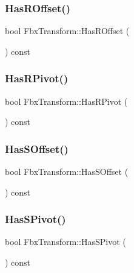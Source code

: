 \subsubsection{\texorpdfstring{Has\+R\+Offset()}{HasROffset()}}
{\footnotesize\ttfamily bool Fbx\+Transform\+::\+Has\+R\+Offset (\begin{DoxyParamCaption}{ }\end{DoxyParamCaption}) const}

\mbox{\label{class_fbx_transform_af7c5853f01369b5505255c8a92aa8ef7}} 
\subsubsection{\texorpdfstring{Has\+R\+Pivot()}{HasRPivot()}}
{\footnotesize\ttfamily bool Fbx\+Transform\+::\+Has\+R\+Pivot (\begin{DoxyParamCaption}{ }\end{DoxyParamCaption}) const}

\mbox{\label{class_fbx_transform_a09e89d031fec95246efe655aee157bac}} 
\subsubsection{\texorpdfstring{Has\+S\+Offset()}{HasSOffset()}}
{\footnotesize\ttfamily bool Fbx\+Transform\+::\+Has\+S\+Offset (\begin{DoxyParamCaption}{ }\end{DoxyParamCaption}) const}

\mbox{\label{class_fbx_transform_a92416fa3e515aea2f5b52e0304a21a05}} 
\subsubsection{\texorpdfstring{Has\+S\+Pivot()}{HasSPivot()}}
{\footnotesize\ttfamily bool Fbx\+Transform\+::\+Has\+S\+Pivot (\begin{DoxyParamCaption}{ }\end{DoxyParamCaption}) const}

